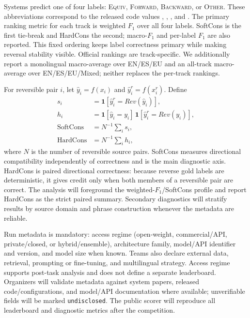 \documentclass[11pt]{article}
\newif\ifshowrevisions
\newcommand{\rev}[1]{\ifshowrevisions{\color{revisionblue}#1}\else#1\fi}
\newcommand{\EquivLabel}{\textsc{Equiv}}
\newcommand{\ForwardLabel}{\textsc{Forward}}
\newcommand{\BackwardLabel}{\textsc{Backward}}
\newcommand{\NegativeLabel}{\textsc{Other}}
\begin{document}
Systems predict one of four labels: \EquivLabel{}, \ForwardLabel{}, \BackwardLabel{}, or \NegativeLabel{}. These abbreviations correspond to the released code values , , , and .
\rev{The primary ranking metric for each track is weighted $F_1$ over all four labels. SoftCons is the first tie-break and HardCons the second; macro-$F_1$ and per-label $F_1$ are also reported. This fixed ordering keeps label correctness primary while making reversal stability visible. Official rankings are track-specific. We additionally report a monolingual macro-average over EN/ES/EU and an all-track macro-average over EN/ES/EU/Mixed; neither replaces the per-track rankings.}

For reversible pair $i$, let $\hat y_i=f(x_i)$ and $\hat y_i^r=f(x_i^r)$. Define
\begin{align*}
s_i &= \mathbf{1}[\hat y_i^r=Rev(\hat y_i)],\\
h_i &= \mathbf{1}[\hat y_i=y_i] \, \mathbf{1}[\hat y_i^r=Rev(y_i)],\\
\mathrm{SoftCons} &= N^{-1}\sum_i s_i,\\
\mathrm{HardCons} &= N^{-1}\sum_i h_i,
\end{align*}
where $N$ is the number of reversible source pairs.
\rev{SoftCons measures directional compatibility independently of correctness and is the main diagnostic axis. HardCons is paired directional correctness: because reverse gold labels are deterministic, it gives credit only when both members of a reversible pair are correct. The analysis will foreground the weighted-$F_1$/SoftCons profile and report HardCons as the strict paired summary. Secondary diagnostics will stratify results by source domain and phrase construction whenever the metadata are reliable.}

Run metadata is mandatory: access regime (open-weight, commercial/API, private/closed, or hybrid/ensemble), architecture family, model/API identifier and version, and model size when known. Teams also declare external data, retrieval, prompting or fine-tuning, and multilingual strategy. Access regime supports post-task analysis and does not define a separate leaderboard. Organizers will validate metadata against system papers, released code/configurations, and model/API documentation where available; unverifiable fields will be marked \texttt{undisclosed}.
The public scorer will reproduce all leaderboard and diagnostic metrics after the competition.
\end{document}
